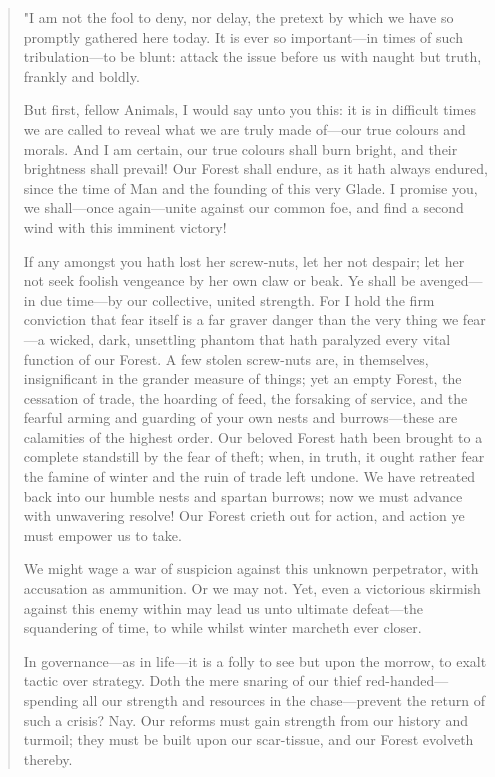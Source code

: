 \begingroup
\fontsize{10pt}{12pt}\selectfont
	\begin{quote}
		"I am not the fool to deny, nor delay, the pretext by which we have so promptly gathered here today.
		It is ever so important---in times of such tribulation---to be blunt: attack the issue before us with naught but truth, frankly and boldly.
		
		
		But first, fellow Animals, I would say unto you this: it is in difficult times we are called to reveal what we are truly made of---our true colours and morals.
		And I am certain, our true colours shall burn bright, and their brightness shall prevail!
		Our Forest shall endure, as it hath always endured, since the time of Man and the founding of this very Glade.
		I promise you, we shall---once again---unite against our common foe, and find a second wind with this imminent victory!
		
		If any amongst you hath lost her screw-nuts, let her not despair; let her not seek foolish vengeance by her own claw or beak.
		Ye shall be avenged---in due time---by our collective, united strength.
		For I hold the firm conviction that fear itself is a far graver danger than the very thing we fear---a wicked, dark, unsettling phantom that hath paralyzed every vital function of our Forest.
		A few stolen screw-nuts are, in themselves, insignificant in the grander measure of things; yet an empty Forest, the cessation of trade, the hoarding of feed, the forsaking of service, and the fearful arming and guarding of your own nests and burrows---these are calamities of the highest order.
		Our beloved Forest hath been brought to a complete standstill by the fear of theft; when, in truth, it ought rather fear the famine of winter and the ruin of trade left undone.
		We have retreated back into our humble nests and spartan burrows; now we must advance with unwavering resolve!
		Our Forest crieth out for action, and action ye must empower us to take.

		We might wage a war of suspicion against this unknown perpetrator, with accusation as ammunition.
		Or we may not.
		Yet, even a victorious skirmish against this enemy within may lead us unto ultimate defeat---the squandering of time, to while whilst winter marcheth ever closer.
		
		In governance---as in life---it is a folly to see but upon the morrow, to exalt tactic over strategy.
		Doth the mere snaring of our thief red-handed---spending all our strength and resources in the chase---prevent the return of such a crisis?
		Nay.
		Our reforms must gain strength from our history and turmoil; they must be built upon our scar-tissue, and our Forest evolveth thereby.
		

\end{quote}
